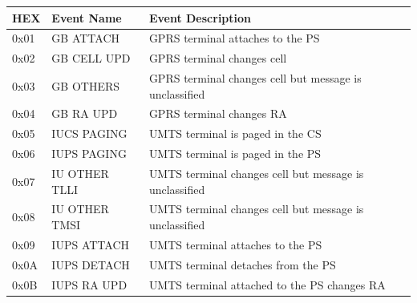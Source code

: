 \documentclass[master,english]{hgbthesis}
\begin{document}
{\small
	\begin{longtable}{|l|p{4cm}|p{8cm}|}
		\hline
		\textbf{HEX} & \textbf{ Event Name}                 & \textbf{Event Description}                                                                                 \\ \hline
		0x01         & GB ATTACH                            & GPRS terminal attaches to the PS                                                                           \\ \hline
		0x02         & GB CELL UPD                          & GPRS terminal changes cell                                                                                 \\ \hline
		0x03         & GB OTHERS                            & GPRS terminal changes cell but message is unclassified                                                     \\ \hline
		0x04         & GB RA UPD                            & GPRS terminal changes RA                                                                                   \\ \hline
		0x05         & IUCS PAGING                          & UMTS terminal is paged in the CS                                                                           \\ \hline
		0x06         & IUPS PAGING                          & UMTS terminal is paged in the PS                                                                           \\ \hline
		0x07         & IU OTHER TLLI                        & UMTS terminal changes cell but message is unclassified                                                     \\ \hline
		0x08         & IU OTHER TMSI                        & UMTS terminal changes cell but message is unclassified                                                     \\ \hline
		0x09         & IUPS ATTACH                          & UMTS terminal attaches to the PS                                                                           \\ \hline
		0x0A         & IUPS DETACH                          & UMTS terminal detaches from the PS                                                                         \\ \hline
		0x0B         & IUPS RA UPD                          & UMTS terminal attached to the PS changes RA                                                                \\ \hline

\end{longtable}}
\end{document}
